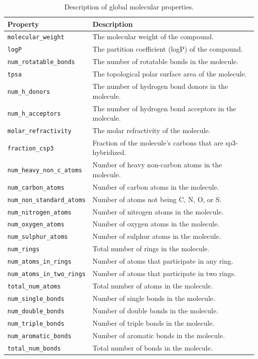 \begin{table}[h!]
\centering
\begin{tabular}{|l|l|}
\hline
\textbf{Property} & \textbf{Description} \\ \hline
\texttt{molecular\_weight} & The molecular weight of the compound. \\ \hline
\texttt{logP} & The partition coefficient (logP) of the compound. \\ \hline
\texttt{num\_rotatable\_bonds} & The number of rotatable bonds in the molecule. \\ \hline
\texttt{tpsa} & The topological polar surface area of the molecule. \\ \hline
\texttt{num\_h\_donors} & The number of hydrogen bond donors in the molecule. \\ \hline
\texttt{num\_h\_acceptors} & The number of hydrogen bond acceptors in the molecule. \\ \hline
\texttt{molar\_refractivity} & The molar refractivity of the molecule. \\ \hline
\texttt{fraction\_csp3} & Fraction of the molecule's carbons that are sp3-hybridized. \\ \hline
\texttt{num\_heavy\_non\_c\_atoms} & Number of heavy non-carbon atoms in the molecule. \\ \hline
\texttt{num\_carbon\_atoms} & Number of carbon atoms in the molecule. \\ \hline
\texttt{num\_non\_standard\_atoms} & Number of atoms not being C, N, O, or S. \\ \hline
\texttt{num\_nitrogen\_atoms} & Number of nitrogen atoms in the molecule. \\ \hline
\texttt{num\_oxygen\_atoms} & Number of oxygen atoms in the molecule. \\ \hline
\texttt{num\_sulphur\_atoms} & Number of sulphur atoms in the molecule. \\ \hline
\texttt{num\_rings} & Total number of rings in the molecule. \\ \hline
\texttt{num\_atoms\_in\_rings} & Number of atoms that participate in any ring. \\ \hline
\texttt{num\_atoms\_in\_two\_rings} & Number of atoms that participate in two rings. \\ \hline
\texttt{total\_num\_atoms} & Total number of atoms in the molecule. \\ \hline
\texttt{num\_single\_bonds} & Number of single bonds in the molecule. \\ \hline
\texttt{num\_double\_bonds} & Number of double bonds in the molecule. \\ \hline
\texttt{num\_triple\_bonds} & Number of triple bonds in the molecule. \\ \hline
\texttt{num\_aromatic\_bonds} & Number of aromatic bonds in the molecule. \\ \hline
\texttt{total\_num\_bonds} & Total number of bonds in the molecule. \\ \hline
\end{tabular}
\caption{Description of global molecular properties.}
\label{tab:molecular_properties}
\end{table}



